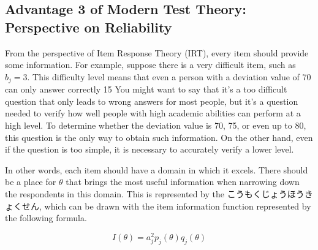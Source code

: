 \documentclass{ltjsbook}
\begin{document}
\subsection{Advantage 3 of Modern Test Theory: Perspective on Reliability}
From the perspective of Item Response Theory (IRT), every item should provide some information. For example, suppose there is a very difficult item, such as $b_j=3$. This difficulty level means that even a person with a deviation value of 70 can only answer correctly 15%
You might want to say that it's a too difficult question that only leads to wrong answers for most people, but it's a question needed to verify how well people with high academic abilities can perform at a high level. To determine whether the deviation value is 70, 75, or even up to 80, this question is the only way to obtain such information. On the other hand, even if the question is too simple, it is necessary to accurately verify a lower level.

In other words, each item should have a domain in which it excels. There should be a place for $\theta$ that brings the most useful information when narrowing down the respondents in this domain.
This is represented by the  {こうもくじょうほうきょくせん}, which can be drawn with the item information function represented by the following formula.

\[ I(\theta) = a_j^2 p_j(\theta)q_j(\theta)\]
\end{document}
